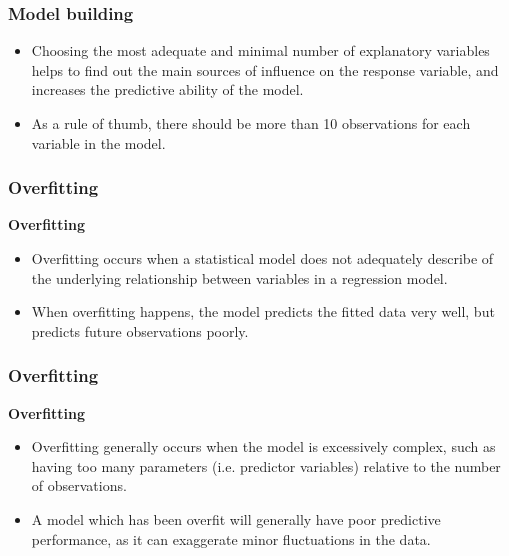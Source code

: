\documentclass[PredictiveAnalytics101.tex]{subfiles}
\begin{document}
\begin{frame}
	\Large
	\frametitle{Model building}
	\begin{itemize}
		\item Choosing the most adequate and minimal number of explanatory variables helps to find out the main sources of influence on the response variable, and increases the predictive ability of the model. 
		\item As a rule of thumb, there should be more than 10 observations for each variable in the model.
	\end{itemize}
	
\end{frame}
\begin{frame}
	\frametitle{Overfitting}
	\Large
	\textbf{Overfitting}
	\begin{itemize}
		\item Overfitting occurs when a statistical model does not adequately describe of the underlying relationship between variables in a regression model. 
		\item When overfitting happens, the model predicts the fitted data very well, but predicts future observations poorly.
	\end{itemize}
\end{frame}
\begin{frame}
	\frametitle{Overfitting}
	\Large
	\textbf{Overfitting}
	\begin{itemize}
		\item 
		Overfitting generally occurs when the model is excessively complex, such as having too many parameters (i.e. predictor variables) relative to the number of observations. 
		\item A model which has been overfit will generally have poor predictive performance, as it can exaggerate minor fluctuations in the data.
	\end{itemize}
	
	
\end{frame}
\end{document}
